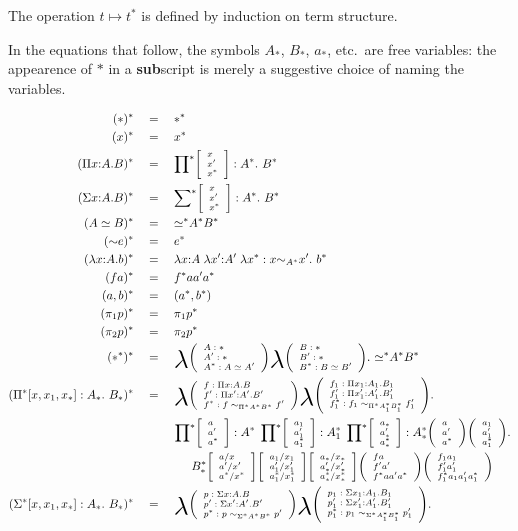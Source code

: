 \documentclass[10pt]{article}
\newcommand{\sta}{*}
\newcommand{\eq}{\quad=\quad}
\newcommand{\phanq}{\phantom{\eq\qquad}}
\newcommand{\hista}{\!\raisebox{1mm}{${}^*$}}
\newcommand{\blam}{\raisebox{-2mm}{\scalebox{2.1}{$\lambda$}}}
\newcommand{\eeq}{\simeq}
\newcommand{\seq}{{\eeq}^*}
\newcommand{\ssim}{{\sim}}
\newcommand{\trip}[3]{
{\scriptsize \left[
  \begin{array}{l}
    {#1}\\
    {#2}\\
    {#3}
  \end{array}
\right]}}
\newcommand{\tripar}[3]{
{\scriptsize \left(
  \begin{array}{l}
    {#1}\\
    {#2}\\
    {#3}
  \end{array}
\right)}}
\newenvironment{definition}{{\sc Definition.}}{}
\begin{document}
  \begin{definition}
The operation $t \mapsto t^*$ is defined by induction on term structure.

In the equations that follow, the symbols $A_*$, $B_*$, $a_*$, etc.\ are free
variables: the appearence of $*$ in a {\bf sub}script is merely a suggestive choice of
naming the variables.

\begin{align*}
  (\sta)^* &\eq \sta^*\\
  (x)^* &\eq x^*\\
  (\Pi x{:}A. B)^* &\eq \prod\hista \trip{x}{x'}{x^*} : A^*.\ B^*\\
  (\Sigma x{:} A. B)^* &\eq \sum\hista \trip{x}{x'}{x^*} : A^*.\ B^*\\
  (A \eeq B)^* &\eq \seq A^* B^*\\
(\ssim e)^* &\eq e^*\\
(\lambda x{:}A.b)^* &\eq \lambda x{:}A\; \lambda x'{:}A'\;
  \lambda x^* : x {\sim_{A^*}} x'.\   b^*
\\(f a)^* &\eq f^* a a' a^* \\(a,b)^* &\eq (a^*,b^*)\\
  (\pi_1 p)^* &\eq \pi_1 p^*\\
  (\pi_2 p)^* &\eq \pi_2 p^*\\
 (\sta^*)^* &\eq \blam \tripar {A : \sta }{A' : \sta} {A^* : A \eeq A'}
\blam \tripar {B : \sta} {B': \sta} {B^* : B \eeq B'}.\ \seq A^* B^*
\\
 (\Pi^* [x,x_1,x_*] : A_*.\ B_*)^* &\eq
\blam \tripar { f : \Pi x{:}A.B}{ f':\Pi x'{:}A'.B'}{ f^*
 : f \sim_{\Pi^* A^* B^*} f'}
\blam \tripar {f_1 : \Pi x_1{:}A_1.B_1} {f'_1:\Pi x_1' {:}A_1'.B_1'} {f^*_1
 : f_1 \sim_{\Pi^* A^*_1 B^*_1} f'_1}.\\
&\phantom{\eq\;}\,
\prod\hista \trip{a}{a'}{a^*} : A^*\;
\prod\hista \trip{a_1}{a_1'}{a_1^*} : A_1^*\;
\prod\hista \trip{a_* }{a_*'}{a_*^*} : A_*^*  \tripar{a}{a'}{a^*} \tripar{a_1}{a'_1}{a^*_1}.\\
&\phanq
B^*_* \trip{a/x}{a'/x'}{a^*/x^*}
\trip{a_1/x_1}{a_1'/x_1'}{a_1^*/x_1^*}
\trip{a_*/x_*}{a_*'/x_*'}{a_*^*/x_*^*}
\tripar{f a}{f' a'}{f^* a a' a^*}
\tripar{f_1 a_1}{f'_1 a'_1}{f^*_1 a_1 a'_1 a^*_1}
\\
 (\Sigma^* [x,x_1,x_*] : A_*.\ B_*)^*
&\eq \blam \tripar{p : \Sigma x{:}A.B}{p':\Sigma x'{:}A'.B'}
{p^* : p \sim_{\Sigma^* A^* B^*} p'}
\blam \tripar {p_1 : \Sigma x_1{:}A_1.B_1} {p_1' : \Sigma x_1'{:}A_1'.B_1'} {p_1^* : p_1 \sim_{\Sigma^* A_1^* B_1^*} p_1'}.\\

\end{align*}
\end{definition}
\end{document}
